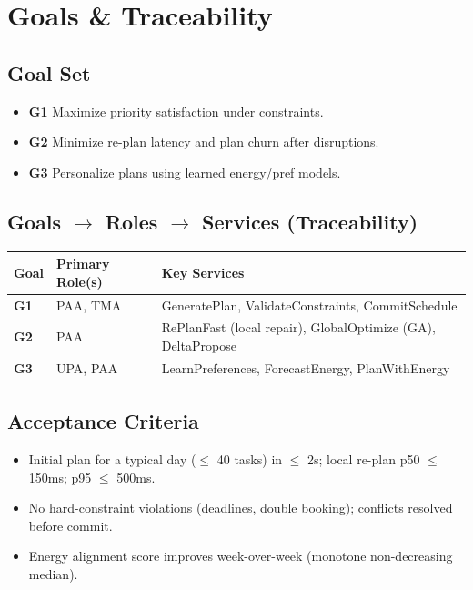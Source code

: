 \documentclass[12pt,oneside]{report}
\begin{document}
\chapter{Goals \& Traceability}
\section{Goal Set}
\begin{itemize}[leftmargin=1.2cm]
  \item \textbf{G1} Maximize priority satisfaction under constraints.
  \item \textbf{G2} Minimize re-plan latency and plan churn after disruptions.
  \item \textbf{G3} Personalize plans using learned energy/pref models.
\end{itemize}

\section{Goals \texorpdfstring{$\rightarrow$}{->} Roles \texorpdfstring{$\rightarrow$}{->} Services (Traceability)}
\begin{longtable}{@{}p{2cm}p{4.2cm}p{7.8cm}@{}}
\toprule
\textbf{Goal} & \textbf{Primary Role(s)} & \textbf{Key Services} \\
\midrule
\textbf{G1} & PAA, TMA & GeneratePlan, ValidateConstraints, CommitSchedule \\
\textbf{G2} & PAA & RePlanFast (local repair), GlobalOptimize (GA), DeltaPropose \\
\textbf{G3} & UPA, PAA & LearnPreferences, ForecastEnergy, PlanWithEnergy \\
\bottomrule
\end{longtable}

\section{Acceptance Criteria}
\begin{itemize}[leftmargin=1.2cm]
  \item Initial plan for a typical day ($\leq$ 40 tasks) in $\leq$ 2s; local re-plan p50 $\leq$ 150ms; p95 $\leq$ 500ms.
  \item No hard-constraint violations (deadlines, double booking); conflicts resolved before commit.
  \item Energy alignment score improves week-over-week (monotone non-decreasing median).
\end{itemize}
\end{document}

